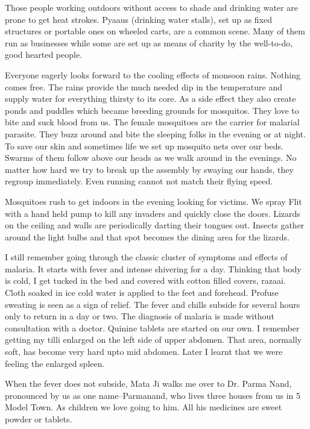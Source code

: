 Those people working outdoors without access to shade and drinking water
are prone to get heat strokes. Pyaaus (drinking water stalls), set up as
fixed structures or portable ones on wheeled carts, are a common scene.
Many of them run as businesses while some are set up as means of charity
by the well-to-do, good hearted people. 

Everyone eagerly looks forward to the cooling effects of monsoon rains.
Nothing comes free. The rains provide the much needed dip in the
temperature and supply water for everything thirsty to its core. As a side
effect they also create ponds and puddles which became breeding grounds
for mosquitos. They love to bite and suck blood from us. The female
mosquitoes are the carrier for malarial parasite. They buzz around and
bite the sleeping folks in the evening or at night. To save our skin and
sometimes life we set up mosquito nets over our beds.  Swarms of them
follow above our heads as we walk around in the evenings. No matter how
hard we try to break up the assembly by swaying our hands, they regroup
immediately. Even running cannot not match their flying speed. 

Mosquitoes rush to get indoors in the evening looking for victims. We
spray Flit with a hand held pump to kill any invaders and quickly close
the doors. Lizards on the ceiling and walls are periodically darting their
tongues out. Insects gather around the light bulbs and that spot becomes
the dining area for the lizards. 

I still remember going through the classic cluster of symptoms and effects
of malaria. It starts with fever and intense shivering for a day. Thinking
that body is cold, I get tucked in the bed and covered with cotton filled
covers, razaai. Cloth soaked in ice cold water is applied to the feet and
forehead. Profuse sweating is seen as a sign of relief. The fever and
chills subside for several hours only to return in a day or two. The
diagnosis of malaria is made without consultation with a doctor.  Quinine
tablets are started on our own. I remember getting my tilli enlarged on
the left side of upper abdomen. That area, normally soft, has become very
hard upto mid abdomen.  Later I learnt that we were feeling the enlarged
spleen. 

When the fever does not subside, Mata Ji walks me over to Dr. Parma Nand,
pronounced by us as one name--Parmanand, who lives three houses from us in
5 Model Town. As children we love going to him. All his medicines are
sweet powder or tablets. 

